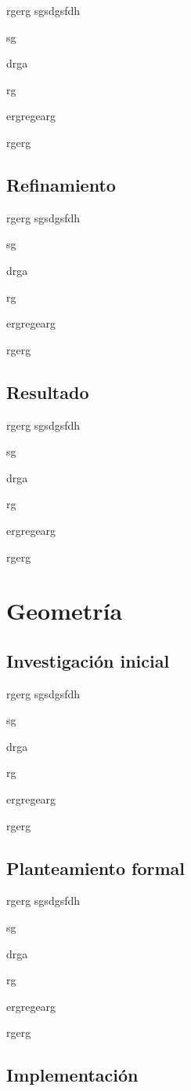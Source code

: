 rgerg
sgsdgsfdh

sg

drga

rg

ergregearg

rgerg

\subsection{Refinamiento}

rgerg
sgsdgsfdh

sg

drga

rg

ergregearg

rgerg

\subsection{Resultado}

rgerg
sgsdgsfdh

sg

drga

rg

ergregearg

rgerg

\section{Geometría}


\subsection{Investigación inicial}

rgerg
sgsdgsfdh

sg

drga

rg

ergregearg

rgerg

\subsection{Planteamiento formal}

rgerg
sgsdgsfdh

sg

drga

rg

ergregearg

rgerg

\subsection{Implementación}

